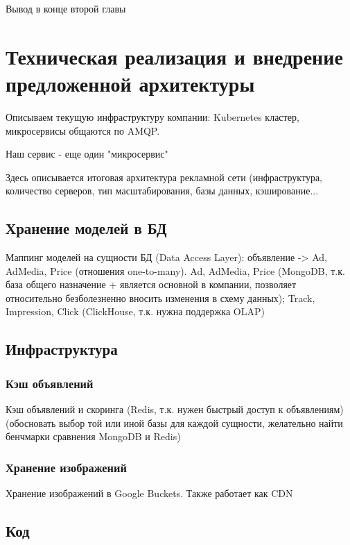 \documentclass[times]{itmo-student-thesis}
\begin{document}
Вывод в конце второй главы






\chapter{Техническая реализация и внедрение предложенной архитектуры}

Описываем текущую инфраструктуру компании: Kubernetes кластер, микросервисы общаются по AMQP.

Наш сервис -  еще один "микросервис"

Здесь описывается итоговая архитектура рекламной сети (инфраструктура, количество серверов, тип масштабирования, базы данных, кэширование...




\section{Хранение моделей в БД}

Маппинг моделей на сущности БД (Data Access Layer): 
объявление -> Ad, AdMedia, Price (отношения one-to-many). 
Ad, AdMedia, Price (MongoDB, т.к. база общего назначение + является основной в компании, позволяет относительно безболезненно вносить изменения в схему данных); Track, Impression, Click (ClickHouse, т.к. нужна поддержка OLAP)




\section{Инфраструктура}

\subsection{Кэш объявлений}

Кэш объявлений и скоринга (Redis, т.к. нужен быстрый доступ к объявлениям) (обосновать выбор той или иной базы для каждой сущности, желательно найти бенчмарки сравнения MongoDB и Redis)


\subsection{Хранение изображений}
Хранение изображений в Google Buckets. Также работает как CDN




\section{Код}
\end{document}
